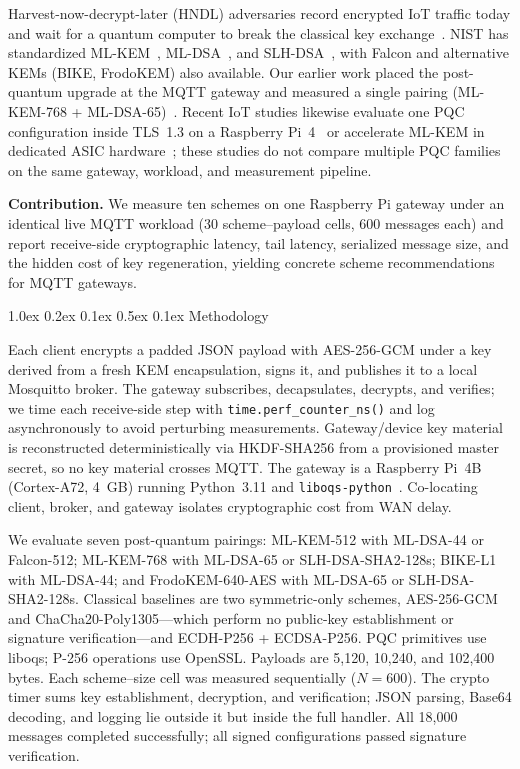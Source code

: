 \documentclass[a4paper,twocolumn,10pt]{article}
\makeatletter
\renewcommand{\section}{\@startsection{section}{1}{\z@}%
  {1.0ex \@plus 0.2ex \@minus 0.1ex}%
  {0.5ex \@plus 0.1ex}%
  {\normalfont\normalsize\bfseries}}
\makeatother
\begin{document}
Harvest-now-decrypt-later (HNDL) adversaries record encrypted IoT traffic today and wait for a quantum computer to break the classical key exchange~\cite{shor1994,mosca2018}. NIST has standardized ML-KEM~\cite{nist_fips203}, ML-DSA~\cite{nist_fips204}, and SLH-DSA~\cite{nist_fips205}, with Falcon and alternative KEMs (BIKE, FrodoKEM) also available. Our earlier work placed the post-quantum upgrade at the MQTT gateway and measured a single pairing (ML-KEM-768 + ML-DSA-65)~\cite{rahman2025kics}. Recent IoT studies likewise evaluate one PQC configuration inside TLS~1.3 on a Raspberry Pi~4~\cite{shahid2025pqtls} or accelerate ML-KEM in dedicated ASIC hardware~\cite{dimatteo2026kem22}; these studies do not compare multiple PQC families on the same gateway, workload, and measurement pipeline.

\textbf{Contribution.} We measure ten schemes on one Raspberry Pi gateway under an identical live MQTT workload (30 scheme--payload cells, 600 messages each) and report receive-side cryptographic latency, tail latency, serialized message size, and the hidden cost of key regeneration, yielding concrete scheme recommendations for MQTT gateways.

\section{Methodology}

Each client encrypts a padded JSON payload with AES-256-GCM under a key derived from a fresh KEM encapsulation, signs it, and publishes it to a local Mosquitto broker. The gateway subscribes, decapsulates, decrypts, and verifies; we time each receive-side step with \texttt{time.perf\_counter\_ns()} and log asynchronously to avoid perturbing measurements. Gateway/device key material is reconstructed deterministically via HKDF-SHA256 from a provisioned master secret, so no key material crosses MQTT. The gateway is a Raspberry Pi~4B (Cortex-A72, 4~GB) running Python~3.11 and \texttt{liboqs-python}~\cite{oqs2023}. Co-locating client, broker, and gateway isolates cryptographic cost from WAN delay.

We evaluate seven post-quantum pairings: ML-KEM-512 with ML-DSA-44 or Falcon-512; ML-KEM-768 with ML-DSA-65 or SLH-DSA-SHA2-128s; BIKE-L1 with ML-DSA-44; and FrodoKEM-640-AES with ML-DSA-65 or SLH-DSA-SHA2-128s. Classical baselines are two symmetric-only schemes, AES-256-GCM and ChaCha20-Poly1305---which perform no public-key establishment or signature verification---and ECDH-P256 + ECDSA-P256. PQC primitives use liboqs; P-256 operations use OpenSSL. Payloads are 5,120, 10,240, and 102,400 bytes. Each scheme--size cell was measured sequentially ($N=600$). The crypto timer sums key establishment, decryption, and verification; JSON parsing, Base64 decoding, and logging lie outside it but inside the full handler. All 18,000 messages completed successfully; all signed configurations passed signature verification.
\end{document}

